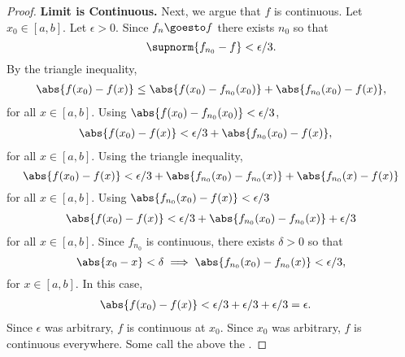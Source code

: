 \begin{prop}
\begin{proof}
\textbf{Limit is Continuous.}
Next, we argue that $f$ is continuous.
Let $x_0 \in [a, b]$.
Let $\epsilon > 0$.
Since $f_n \goesto f$ there exists
$n_0$ so that
\[
  \supnorm{f_{n_0} - f} < \epsilon/3.
\]
By the triangle inequality,
\[
  \begin{aligned}
    \abs{f(x_0) - f(x)} \leq \abs{f(x_0) - f_{n_0}(x_0)} + \abs{f_{n_0}(x_0) - f(x)},
  \end{aligned}
\]
for all $x \in [a, b]$.
Using
$\abs{f(x_0) - f_{n_0}(x_0)} < \epsilon/3$,
\[
  \begin{aligned}
    \abs{f(x_0) - f(x)} &< \epsilon/3 + \abs{f_{n_0}(x_0) - f(x)},
  \end{aligned}
\]
for all $x \in [a, b]$.
Using the triangle inequality,
\[
   \abs{f(x_0) - f(x)} < \epsilon/3 + \abs{f_{n_0}(x_0) - f_{n_0}(x)} + \abs{f_{n_0}(x) - f(x)} \\
\]
for all $x \in [a, b]$.
Using
$\abs{f_{n_0}(x_0) - f(x)} < \epsilon/3$
\[
  \begin{aligned}
   \abs{f(x_0) - f(x)} < \epsilon/3 + \abs{f_{n_0}(x_0) - f_{n_0}(x)} + \epsilon/3 \\
  \end{aligned}
\]
for all $x \in [a, b]$.
Since $f_{n_0}$ is
continuous, there exists
$\delta > 0$ so that
\[
  \abs{x_0 - x} < \delta
  \implies
  \abs{f_{n_0}(x_0) - f_{n_0}(x)} < \epsilon/3,
\]
for $x \in [a, b]$.
In this case,
\[
  \begin{aligned}
    \abs{f(x_0) - f(x)} &< \epsilon/3 + \epsilon/3 + \epsilon/3 = \epsilon.
  \end{aligned}
\]
Since $\epsilon$ was arbitrary, $f$
is continuous at $x_0$.
Since $x_0$ was arbitrary,
$f$ is continuous everywhere.
Some call the above the
.
\end{proof}

\end{prop}
